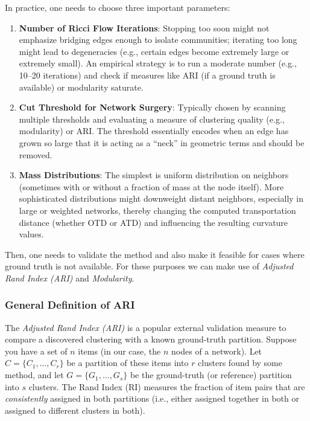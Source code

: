 In practice, one needs to choose three important parameters:
\begin{enumerate}
    \item \textbf{Number of Ricci Flow Iterations}: Stopping too soon might not emphasize bridging edges enough to isolate communities; iterating too long might lead to degeneracies (e.g., certain edges become extremely large or extremely small). An empirical strategy is to run a moderate number (e.g., 10--20 iterations) and check if measures like ARI (if a ground truth is available) or modularity saturate.

    \item \textbf{Cut Threshold for Network Surgery}: Typically chosen by scanning multiple thresholds and evaluating a measure of clustering quality (e.g., modularity) or ARI. The threshold essentially encodes when an edge has grown so large that it is acting as a “neck” in geometric terms and should be removed.

    \item \textbf{Mass Distributions}: The simplest is uniform distribution on neighbors (sometimes with or without a fraction of mass at the node itself). More sophisticated distributions might downweight distant neighbors, especially in large or weighted networks, thereby changing the computed transportation distance (whether OTD or ATD) and influencing the resulting curvature values.
\end{enumerate}

Then, one needs to validate the method and also make it feasible for cases where ground truth is not available. For these purposes we can make use of \emph{Adjusted Rand Index (ARI)} and \emph{Modularity}.

\subsubsection{General Definition of ARI}
The \emph{Adjusted Rand Index (ARI)} is a popular external validation measure to compare a discovered clustering with a known ground-truth partition. Suppose you have a set of $n$ items (in our case, the $n$ nodes of a network). Let $C = \{C_1, \ldots, C_r\}$ be a partition of these items into $r$ clusters found by some method, and let $G = \{G_1, \ldots, G_s\}$ be the ground-truth (or reference) partition into $s$ clusters. The Rand Index (RI) measures the fraction of item pairs that are \emph{consistently} assigned in both partitions (i.e., either assigned together in both or assigned to different clusters in both). 

